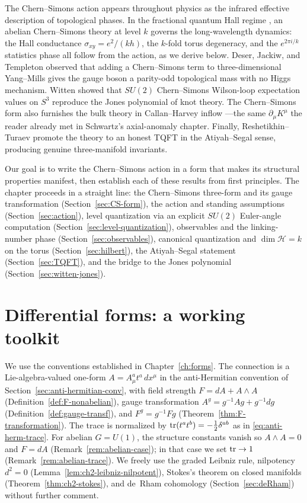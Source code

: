 \noindent The Chern--Simons action appears throughout physics as the infrared effective description of topological phases.  In the fractional quantum Hall regime \cite{Tong2016QHE}, an abelian Chern--Simons theory at level $k$ governs the long-wavelength dynamics: the Hall conductance $\sigma_{xy} = e^2/(kh)$, the $k$-fold torus degeneracy, and the $e^{2\pi i/k}$ statistics phase all follow from the action, as we derive below.  Deser, Jackiw, and Templeton \cite{DeserJackiwTempleton1982} observed that adding a Chern--Simons term to three-dimensional Yang--Mills gives the gauge boson a parity-odd topological mass with no Higgs mechanism.  Witten \cite{Witten1989Jones} showed that $SU(2)$ Chern--Simons Wilson-loop expectation values on $S^3$ reproduce the Jones polynomial of knot theory.  The Chern--Simons form also furnishes the bulk theory in Callan--Harvey inflow \cite{CallanHarvey1985}---the same $\partial_\mu K^\mu$ the reader already met in Schwartz's axial-anomaly chapter.  Finally, Reshetikhin--Turaev \cite{ReshetikhinTuraev1991} promote the theory to an honest TQFT in the Atiyah--Segal sense, producing genuine three-manifold invariants.

\medskip

\noindent Our goal is to write the Chern--Simons action in a form that makes its structural properties manifest, then establish each of these results from first principles.  The chapter proceeds in a straight line: the Chern--Simons three-form and its gauge transformation (Section~\ref{sec:CS-form}), the action and standing assumptions (Section~\ref{sec:action}), level quantization via an explicit $SU(2)$ Euler-angle computation (Section~\ref{sec:level-quantization}), observables and the linking-number phase (Section~\ref{sec:observables}), canonical quantization and $\dim\mathcal{H} = k$ on the torus (Section~\ref{sec:hilbert}), the Atiyah--Segal statement (Section~\ref{sec:TQFT}), and the bridge to the Jones polynomial (Section~\ref{sec:witten-jones}).

\section{Differential forms: a working toolkit}\label{sec:forms}

We use the conventions established in Chapter~\ref{ch:forms}. The connection is a Lie-algebra-valued one-form $A = A_\mu^a t^a\, dx^\mu$ in the anti-Hermitian convention of Section~\ref{sec:anti-hermitian-conv}, with field strength $F = dA + A \wedge A$ (Definition~\ref{def:F-nonabelian}), gauge transformation $A^g = g^{-1}Ag + g^{-1}dg$ (Definition~\ref{def:gauge-transf}), and $F^g = g^{-1}Fg$ (Theorem~\ref{thm:F-transformation}). The trace is normalized by $\operatorname{tr}(t^a t^b) = -\tfrac{1}{2}\delta^{ab}$ as in \eqref{eq:anti-herm-trace}. For abelian $G = U(1)$, the structure constants vanish so $A \wedge A = 0$ and $F = dA$ (Remark~\ref{rem:abelian-case}); in that case we set $\operatorname{tr} \to 1$ (Remark~\ref{rem:abelian-trace}). We freely use the graded Leibniz rule, nilpotency $d^2 = 0$ (Lemma~\ref{lem:ch2-leibniz-nilpotent}), Stokes's theorem on closed manifolds (Theorem~\ref{thm:ch2-stokes}), and de~Rham cohomology (Section~\ref{sec:deRham}) without further comment.

